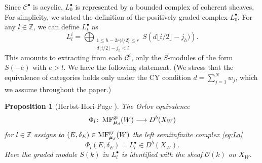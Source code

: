 \documentclass[11pt]{amsart}
\newtheorem{pro}[thm]{Proposition} %
\theoremstyle{definition} %
\theoremstyle{remark} %
\newcommand{\ZZ}{\mathbb Z}
\newcommand{\Ocal}{\mathcal O}
\newcommand{\Ccal}{\mathcal C}
\newcommand{\Pcal}{\mathcal P}
\newcommand{\Sing}{\operatorname{Sing}}
\newcommand{\gr}{\operatorname{gr-}}
\def\MFhom{\operatorname{{MF}}}
\newcommand{\bmu}{\boldsymbol{\mu}}
\begin{document}
Since $\Ccal^\bullet$ is acyclic, 
$L_0^\bullet$ is represented by a bounded complex of 
coherent sheaves. 
For simplicity, we stated the definition 
of the positively graded complex $L_0^\bullet$. 
For any $l\in \ZZ$, 
we can define $L_l^\bullet$ as 
\begin{equation}
\label{eq:La}
L_l^i=\bigoplus_{\substack{{1\le h-2r\langle {i}/2\rangle\le r } 
\\{d\lfloor i/2\rfloor -j_h<l}}} 
S\left(d\lfloor i/2\rfloor -j_h)\right).
\end{equation}
This amounts to extracting from each $\Ccal^i$, 
only the $S$-modules of the form $S(-e)$ with $e>l$. 
We have the following statement.  
(We stress that the equivalence of categories 
holds only under the CY condition 
$d=\sum_{j=1}^N w_j$, which we assume throughout the 
paper.)  
\begin{pro}[Herbst-Hori-Page {\cite[\S 10.6, (10.56--58)]{HHP}}] 
\label{pro:Orlovexplicit} 
The Orlov equivalence  
\[
\Phi_l \colon \MFhom^{\rm gr}_{\bmu_d}(W) 
\longrightarrow D^b(X_W)
\] 
for $l\in \ZZ$ assigns to 
$(E,\delta_E)\in \MFhom^{\rm gr}_{\bmu_d}(W)$ 
the left semiinfinite complex \eqref{eq:La}
\[
\Phi_l(E,\delta_E)=L_l^\bullet\in D^b(X_W). 
\] 
Here the graded module $S(k)$ in $L_l^\bullet$ 
is identified with the sheaf $\Ocal(k)$ on $X_W$. 
\end{pro}
\end{document}
